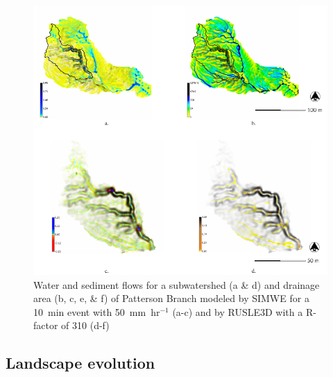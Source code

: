 \documentclass[gmd, manuscript]{copernicus}
\begin{document}
\begin{figure}
\center
\includegraphics[width=\textwidth,height=0.95\textheight,keepaspectratio]{figures/models.pdf}
\caption{Water and sediment flows
for a subwatershed (a \& d) and drainage area (b, c, e, \& f) of Patterson Branch
modeled by SIMWE 
for a 10~\unit{min} event with 50~\unit{mm~hr}$^{-1}$ (a-c)
and by RUSLE3D with a R-factor of 310 (d-f)
}
\label{fig:models}
\end{figure}


\subsection{Landscape evolution}
\end{document}
